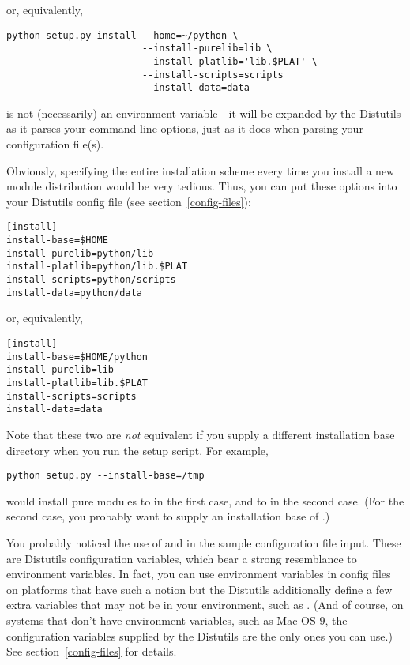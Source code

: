 \documentclass{howto}
\begin{document}
or, equivalently,

\begin{verbatim}
python setup.py install --home=~/python \
                        --install-purelib=lib \
                        --install-platlib='lib.$PLAT' \
                        --install-scripts=scripts
                        --install-data=data
\end{verbatim}

 is not (necessarily) an environment variable---it will be
expanded by the Distutils as it parses your command line options, just
as it does when parsing your configuration file(s).

Obviously, specifying the entire installation scheme every time you
install a new module distribution would be very tedious.  Thus, you can
put these options into your Distutils config file (see
section~\ref{config-files}):

\begin{verbatim}
[install]
install-base=$HOME
install-purelib=python/lib
install-platlib=python/lib.$PLAT
install-scripts=python/scripts
install-data=python/data
\end{verbatim}

or, equivalently,

\begin{verbatim}
[install]
install-base=$HOME/python
install-purelib=lib
install-platlib=lib.$PLAT
install-scripts=scripts
install-data=data
\end{verbatim}

Note that these two are \emph{not} equivalent if you supply a different
installation base directory when you run the setup script.  For example,

\begin{verbatim}
python setup.py --install-base=/tmp
\end{verbatim}

would install pure modules to  in the first
case, and to  in the second case.  (For the second
case, you probably want to supply an installation base of
\file{/tmp/python}.)

You probably noticed the use of \code{\$HOME} and  in the
sample configuration file input.  These are Distutils configuration
variables, which bear a strong resemblance to environment variables.
In fact, you can use environment variables in config files on
platforms that have such a notion but the Distutils additionally
define a few extra variables that may not be in your environment, such
as \code{\$PLAT}.  (And of course, on systems that don't have
environment variables, such as Mac OS 9, the configuration
variables supplied by the Distutils are the only ones you can use.)
See section~\ref{config-files} for details.
\end{document}
